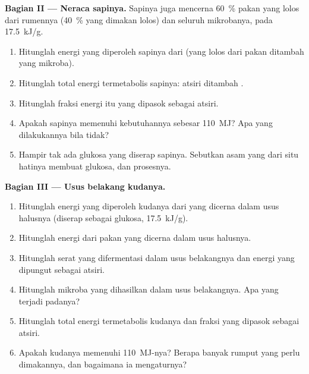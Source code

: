\begin{problem}
\medskip
\noindent\textbf{Bagian II --- Neraca sapinya.}
Sapinya juga mencerna \qty{60}{\%}  pakan yang lolos dari
rumennya (\qty{40}{\%}  yang dimakan lolos) dan seluruh 
mikrobanya, pada \qty{17.5}{kJ/g}.
\begin{enumerate}[resume]
  \item Hitunglah energi yang diperoleh sapinya dari  (yang
        lolos dari pakan ditambah yang mikroba).
  \item Hitunglah total energi termetabolis sapinya:  atsiri
        ditambah .
  \item Hitunglah fraksi energi itu yang dipasok sebagai 
        atsiri.
  \item Apakah sapinya memenuhi kebutuhannya sebesar \qty{110}{MJ}?
        Apa yang dilakukannya bila tidak?
  \item Hampir tak ada glukosa yang diserap sapinya. Sebutkan asam
        yang dari situ hatinya membuat glukosa, dan prosesnya.
\end{enumerate}

\medskip
\noindent\textbf{Bagian III --- Usus belakang kudanya.}
\begin{enumerate}[resume]
  \item Hitunglah energi yang diperoleh kudanya dari  yang dicerna
        dalam usus halusnya (diserap sebagai glukosa, \qty{17.5}{kJ/g}).
  \item Hitunglah energi dari  pakan yang dicerna dalam usus
        halusnya.
  \item Hitunglah serat yang difermentasi dalam usus belakangnya dan
        energi yang dipungut sebagai  atsiri.
  \item Hitunglah  mikroba yang dihasilkan dalam usus
        belakangnya. Apa yang terjadi padanya?
  \item Hitunglah total energi termetabolis kudanya dan fraksi yang
        dipasok sebagai  atsiri.
  \item Apakah kudanya memenuhi \qty{110}{MJ}-nya? Berapa banyak
        rumput yang perlu dimakannya, dan bagaimana ia mengaturnya?
\end{enumerate}


\end{problem}
